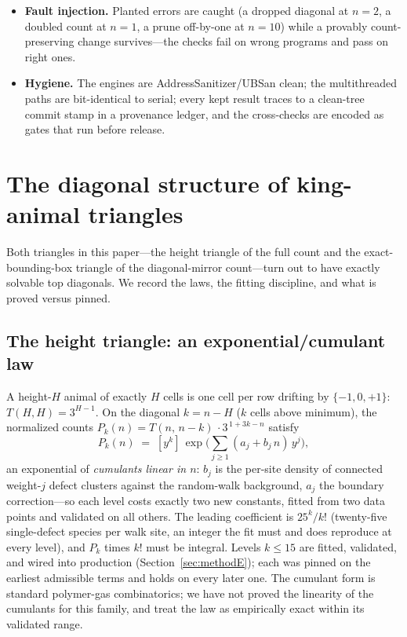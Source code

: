 \documentclass[11pt]{article}
\begin{document}
\begin{itemize}
        enumeration's; rook- and bishop-connected sub-counts reproduce
        A001168; the $H$-cell height-$H$ diagonal is exactly $3^{H-1}$;
        Burnside numerators satisfy their $/4$ and $/8$ integrality at every
        term.
  \item \textbf{Fault injection.} Planted errors are caught (a dropped
        diagonal at $n=2$, a doubled count at $n=1$, a prune off-by-one at
        $n=10$) while a provably count-preserving change survives---the
        checks fail on wrong programs and pass on right ones.
  \item \textbf{Hygiene.} The engines are AddressSanitizer/UBSan clean; the
        multithreaded paths are bit-identical to serial; every kept result
        traces to a clean-tree commit stamp in a provenance ledger, and the
        cross-checks are encoded as gates that run before release.
\end{itemize}

\section{The diagonal structure of king-animal triangles}
\label{sec:diagonals}

Both triangles in this paper---the height triangle of the full count and the
exact-bounding-box triangle of the diagonal-mirror count---turn out to have
exactly solvable top diagonals. We record the laws, the fitting discipline,
and what is proved versus pinned.

\subsection{The height triangle: an exponential/cumulant law}
\label{sec:heightdiag}

A height-$H$ animal of exactly $H$ cells is one cell per row drifting by
$\{-1,0,+1\}$: $T(H,H)=3^{H-1}$. On the diagonal $k=n-H$ ($k$ cells above
minimum), the normalized counts
$P_k(n) = T(n,\,n-k)\,\cdot 3^{\,1+3k-n}$
satisfy
\[
  P_k(n) \;=\; [y^k]\,\exp\!\Big(\sum_{j\ge1}(a_j+b_j\,n)\,y^j\Big),
\]
an exponential of \emph{cumulants linear in $n$}: $b_j$ is the per-site
density of connected weight-$j$ defect clusters against the random-walk
background, $a_j$ the boundary correction---so each level costs exactly two
new constants, fitted from two data points and validated on all others. The
leading coefficient is $25^k/k!$ (twenty-five single-defect species per walk
site, an integer the fit must and does reproduce at every level), and $P_k$
times $k!$ must be integral. Levels $k\le15$ are fitted, validated, and wired
into production (Section~\ref{sec:methodE}); each was pinned on the earliest
admissible terms and holds on every later one. The cumulant form is standard
polymer-gas combinatorics; we have not proved the linearity of the cumulants
for this family, and treat the law as empirically exact within its validated
range.
\end{document}
